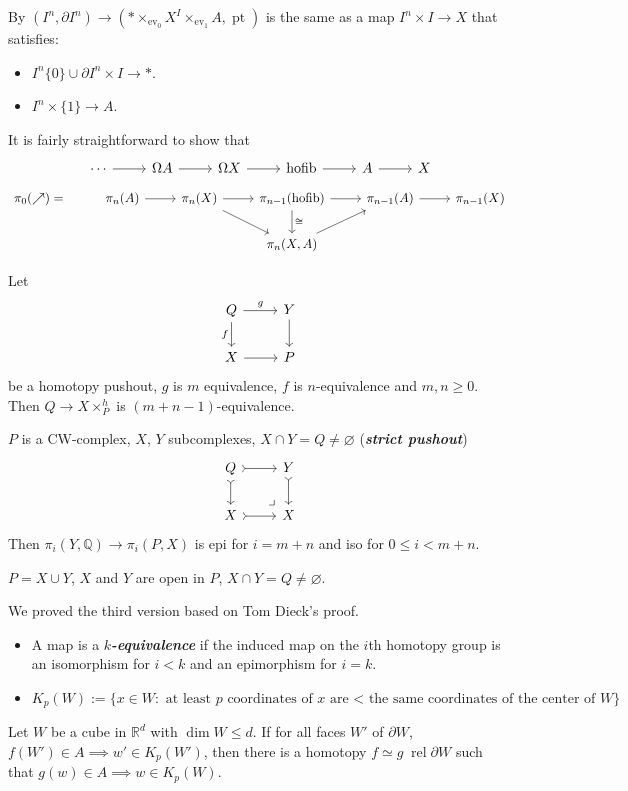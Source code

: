 \documentclass{article}
\newcommand{\Q}{\mathbb{Q}}
\newcommand{\R}{\mathbb{R}}
\DeclareMathOperator{\pt}{pt}
\DeclareMathOperator{\ev}{ev}
\DeclareMathOperator{\hofib}{hofib}
\DeclareMathOperator{\rel}{rel}
\begin{document}
\begin{defn}
	By $(I^n,\partial I^n)\to (*\times_{\ev_0}X^I\times_{\ev_1}A,\pt)$ is the same as a map $I^n\times I\to X$ that satisfies:
	\begin{itemize}
		\item $I^n\{0\}\cup\partial I^n\times I\to*$.
		\item $I^n\times\{1\}\to A$.
	\end{itemize}
\end{defn}
It is fairly straightforward to show that
\[\begin{tikzcd}
	\cdots\arrow[r]&\Omega A\arrow[r]&\Omega X\arrow[r]&\hofib\arrow[r]&A\arrow[r]&X
\end{tikzcd}\]
\[\begin{tikzcd}
	\pi_0(\nearrow)=&\pi_n(A)\arrow[r]&\pi_n(X)\arrow[r]\arrow[dr]&\pi_{n-1}(\hofib)\arrow[d,"\cong"]\arrow[r]&\pi_{n-1}(A)\arrow[r]&\pi_{n-1}(X)\\
	&&&\pi_n(X,A)\arrow[ur]
\end{tikzcd}\]
\begin{thm}
	Let 
	\[\begin{tikzcd}
		Q\arrow[r,"g"]\arrow[d,swap,"f"]&Y\arrow[d]\\
		X\arrow[r]&P
	\end{tikzcd}\]
	be a homotopy pushout, $g$ is $m$ equivalence, $f$ is $n$-equivalence and $m,n\geq0$. Then $Q\to X\times_P^h$ is $(m+n-1)$-equivalence.
\end{thm}
\begin{thm}
	$P$ is a CW-complex, $X$, $Y$ subcomplexes, $X\cap Y=Q\neq\varnothing$ (\textbf{\textit{strict pushout}})
	\[\begin{tikzcd}
		Q\arrow[r,tail]\arrow[d,tail]&Y\arrow[d,tail]\\
		X\arrow[r,tail]&X\arrow[ul, phantom, "\lrcorner", very near start]
	\end{tikzcd}\]
	Then $\pi_i(Y,\Q)\to\pi_i(P,X)$ is epi for $i=m+n$ and iso for $0\leq i<m+n$.
\end{thm}
\begin{thm}
	$P=X\cup Y$, $X$ and $Y$ are open in $P$, $X\cap Y=Q\neq\varnothing$.
\end{thm}
We proved the third version based on Tom Dieck's proof.
\begin{defn}\leavevmode
	\begin{itemize}
		\item 	A map is a \textbf{\textit{$k$-equivalence}} if the induced map on the $i$th homotopy group is an isomorphism for $i<k$ and an epimorphism for $i=k$.
		\item $K_p(W):=\{x\in W:\text{ at least $p$ coordinates of $x$ are < the same coordinates of the center of }W\}$
	\end{itemize}
\end{defn}
\begin{lemma}
	Let $W$ be a cube in $\R^d$ with $\dim W\leq d$. If for all faces $W'$ of $\partial W$, $f(W')\in A\implies w'\in K_p(W')$, then there is a homotopy $f\simeq g\;\rel\partial W$ such that $g(w)\in A\implies w\in K_p(W)$.
\end{lemma}
\end{document}
